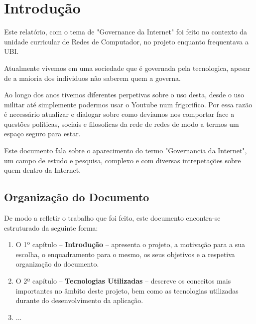 \section{Introdução}
\label{chap:intro}
Este relatório, com o tema de "Governance da Internet" foi feito no contexto da unidade curricular de Redes de Computador, no projeto
enquanto frequentava a \ac{UBI}.

Atualmente vivemos em uma sociedade que é governada pela tecnologica, apesar de a maioria dos individuos
não saberem quem a governa.

Ao longo dos anos tivemos diferentes perpetivas sobre o uso desta,
desde o uso militar até simplemente podermos usar o Youtube num frigorifico. Por essa razão
é necessário atualizar e dialogar sobre como deviamos nos comportar face a questões políticas, sociais e filosoficas da rede de redes
de modo a termos um espaço seguro para estar.

Este documento fala sobre o aparecimento do termo "Governancia da Internet", um campo de estudo e pesquisa,
complexo e com diversas intrepetações sobre quem  dentro da Internet.

\subsection{Organização do Documento}
\label{sec:organ}

De modo a refletir o trabalho que foi feito, este documento encontra-se estruturado da seguinte forma:
\begin{enumerate}
  \item O 1º capítulo -- \textbf{Introdução} -- apresenta o projeto, a motivação para a sua escolha, o enquadramento para o mesmo, os seus objetivos e a respetiva organização do documento.
  \item O 2º capítulo -- \textbf{Tecnologias Utilizadas} -- descreve os conceitos mais importantes no âmbito deste projeto, bem como as tecnologias utilizadas durante do desenvolvimento da aplicação.
  \item ...
\end{enumerate}
